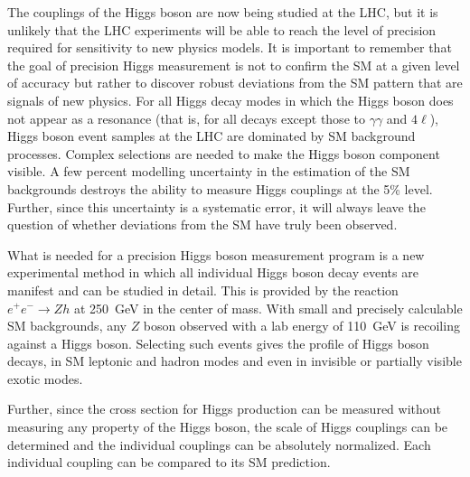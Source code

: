 \documentclass[%
 reprint,
 amsmath,amssymb,
 aps,
]{revtex4-1}
\def\ee{e^+e^-}
\begin{document}
The couplings of the Higgs boson are now being studied at the LHC, but
it is unlikely that the LHC experiments will be able to reach the
level of precision required for sensitivity to new physics models. 
It is important to remember that the goal of
precision Higgs measurement is not to confirm the SM at a given level
of accuracy but rather to discover robust deviations from the SM
pattern that are signals of new physics.   For all Higgs decay modes in which the
Higgs boson does not appear as a resonance (that is, for all decays
except those to 
$\gamma\gamma$ and $4\ell$), Higgs boson event samples at the LHC are dominated
by SM background processes.  Complex selections are needed to make the
Higgs boson component visible. A few percent modelling uncertainty in
the estimation of the SM backgrounds
 destroys the ability to measure Higgs couplings at the 5\%
level.  Further, since this uncertainty is a systematic error, it will
always leave the question of whether deviations from the SM have truly
been observed.

What is needed for a precision Higgs boson measurement program
is a new experimental method in which all individual Higgs boson decay events
are manifest
and can be studied in detail.   This is provided by the reaction
$\ee\to Zh$ at 250~GeV in the center of mass.
  With small and precisely calculable SM backgrounds, any $Z$ boson
  observed with a lab energy of 110~GeV is recoiling against a Higgs
  boson.   Selecting such events gives the profile of Higgs boson
  decays, in SM leptonic and hadron modes and even in invisible or
  partially visible exotic modes. 

Further, since the cross section for Higgs production can be measured
without measuring any property of the Higgs boson, the scale of Higgs
couplings can be determined and the individual couplings can be
absolutely normalized.  Each individual coupling can be compared to
its SM prediction.
\end{document}
